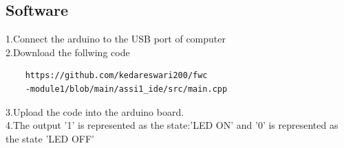 \documentclass[10pt]{report}
\begin{document}
\begin{multicols}{2}
\section{Software}
  1.Connect the arduino to the USB port of computer
  \\
  2.Download the follwing code
  \begin{lstlisting}
    https://github.com/kedareswari200/fwc
    -module1/blob/main/assi1_ide/src/main.cpp
  \end{lstlisting}
  
  3.Upload the code into the arduino board.
  \\
  4.The output '1' is represented as the state:'LED ON' and '0' is represented as the state 'LED OFF'

\end{multicols}
\end{document}
